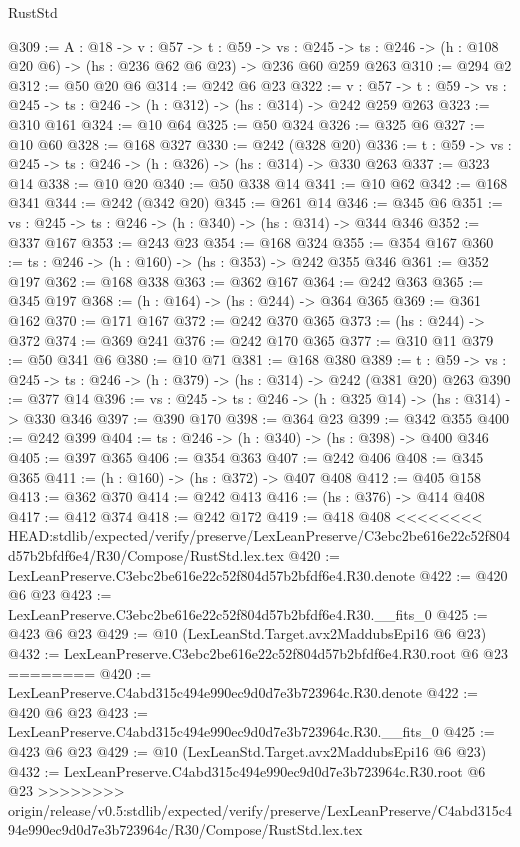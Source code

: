 \begin{lexlean}{RustStd}
\begin{coremodule}
{\begin{coremodule}
@309 := {A : @18} ->
  {v : @57} ->
  {t : @59} ->
  {vs : @245} -> {ts : @246} -> (h : @108 @20 @6) -> (hs : @236 @62 @6 @23) -> @236 @60 @259 @263
@310 := @294 @2
@312 := @50 @20 @6
@314 := @242 @6 @23
@322 := {v : @57} ->
  {t : @59} -> {vs : @245} -> {ts : @246} -> (h : @312) -> (hs : @314) -> @242 @259 @263
@323 := @310 @161
@324 := @10 @64
@325 := @50 @324
@326 := @325 @6
@327 := @10 @60
@328 := @168 @327
@330 := @242 (@328 @20)
@336 := {t : @59} -> {vs : @245} -> {ts : @246} -> (h : @326) -> (hs : @314) -> @330 @263
@337 := @323 @14
@338 := @10 @20
@340 := @50 @338 @14
@341 := @10 @62
@342 := @168 @341
@344 := @242 (@342 @20)
@345 := @261 @14
@346 := @345 @6
@351 := {vs : @245} -> {ts : @246} -> (h : @340) -> (hs : @314) -> @344 @346
@352 := @337 @167
@353 := @243 @23
@354 := @168 @324
@355 := @354 @167
@360 := {ts : @246} -> (h : @160) -> (hs : @353) -> @242 @355 @346
@361 := @352 @197
@362 := @168 @338
@363 := @362 @167
@364 := @242 @363
@365 := @345 @197
@368 := (h : @164) -> (hs : @244) -> @364 @365
@369 := @361 @162
@370 := @171 @167
@372 := @242 @370 @365
@373 := (hs : @244) -> @372
@374 := @369 @241
@376 := @242 @170 @365
@377 := @310 @11
@379 := @50 @341 @6
@380 := @10 @71
@381 := @168 @380
@389 := {t : @59} -> {vs : @245} -> {ts : @246} -> (h : @379) -> (hs : @314) -> @242 (@381 @20) @263
@390 := @377 @14
@396 := {vs : @245} -> {ts : @246} -> (h : @325 @14) -> (hs : @314) -> @330 @346
@397 := @390 @170
@398 := @364 @23
@399 := @342 @355
@400 := @242 @399
@404 := {ts : @246} -> (h : @340) -> (hs : @398) -> @400 @346
@405 := @397 @365
@406 := @354 @363
@407 := @242 @406
@408 := @345 @365
@411 := (h : @160) -> (hs : @372) -> @407 @408
@412 := @405 @158
@413 := @362 @370
@414 := @242 @413
@416 := (hs : @376) -> @414 @408
@417 := @412 @374
@418 := @242 @172
@419 := @418 @408
<<<<<<<< HEAD:stdlib/expected/verify/preserve/LexLeanPreserve/C3ebc2be616e22c52f804d57b2bfdf6e4/R30/Compose/RustStd.lex.tex
@420 := LexLeanPreserve.C3ebc2be616e22c52f804d57b2bfdf6e4.R30.denote
@422 := @420 @6 @23
@423 := LexLeanPreserve.C3ebc2be616e22c52f804d57b2bfdf6e4.R30.__fits_0
@425 := @423 @6 @23
@429 := @10 (LexLeanStd.Target.avx2MaddubsEpi16 @6 @23)
@432 := LexLeanPreserve.C3ebc2be616e22c52f804d57b2bfdf6e4.R30.root @6 @23
========
@420 := LexLeanPreserve.C4abd315c494e990ec9d0d7e3b723964c.R30.denote
@422 := @420 @6 @23
@423 := LexLeanPreserve.C4abd315c494e990ec9d0d7e3b723964c.R30.__fits_0
@425 := @423 @6 @23
@429 := @10 (LexLeanStd.Target.avx2MaddubsEpi16 @6 @23)
@432 := LexLeanPreserve.C4abd315c494e990ec9d0d7e3b723964c.R30.root @6 @23
>>>>>>>> origin/release/v0.5:stdlib/expected/verify/preserve/LexLeanPreserve/C4abd315c494e990ec9d0d7e3b723964c/R30/Compose/RustStd.lex.tex

\end{coremodule}}
\end{coremodule}
\end{lexlean}
